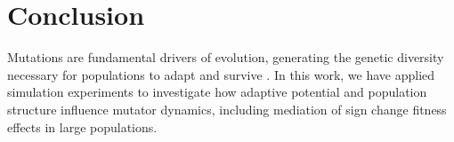 \section{Conclusion} \label{sec:conclusion}


Mutations are fundamental drivers of evolution, generating the genetic diversity necessary for populations to adapt and survive \citep{hershberg2015mutation}.
In this work, we have applied simulation experiments to investigate how adaptive potential and population structure influence mutator dynamics, including mediation of sign change fitness effects in large populations.



